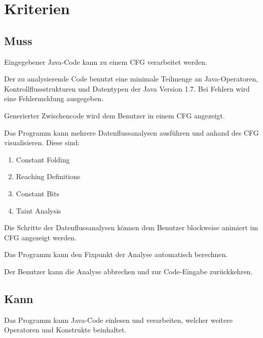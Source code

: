 
\section{Kriterien}

\subsection{Muss}

Eingegebener Java-Code kann zu einem CFG verarbeitet werden.

Der zu analysierende Code benutzt eine minimale Teilmenge an Java-Operatoren, Kontrollflussstrukturen und Datentypen der Java Version 1.7. Bei Fehlern wird eine Fehlermeldung ausgegeben.

Generierter Zwischencode wird dem Benutzer in einem CFG angezeigt.

Das Programm kann mehrere Datenflussanalysen ausführen und anhand des CFG visualisieren.
Diese sind:\par
\begin{enumerate}[label=(\alph*)]
\item Constant Folding
\item Reaching Definitions
\item Constant Bits
\item Taint Analysis
\end{enumerate}

Die Schritte der Datenflussanalysen können dem Benutzer blockweise animiert im CFG angezeigt werden.

Das Programm kann den Fixpunkt der Analyse automatisch berechnen.

Der Benutzer kann die Analyse abbrechen und zur Code-Eingabe zurückkehren.

\subsection{Kann}

Das Programm kann Java-Code einlesen und verarbeiten, welcher weitere Operatoren und Konstrukte beinhaltet.

